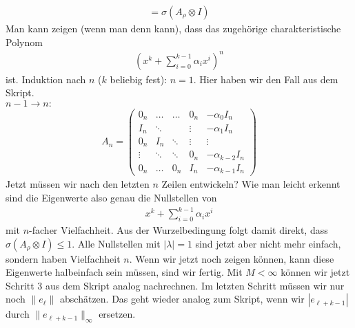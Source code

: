 \begin{solution}
\begin{align*}
  = \sigma(A_{\rho} \otimes I)
\end{align*}
Man kann zeigen (wenn man denn kann), dass das zugehörige charakteristische Polynom
\begin{align*}
  \left(x^k + \sum_{i = 0}^{k-1}\alpha_ix^i\right)^n
\end{align*}
ist. Induktion nach $n$ ($k$ beliebig fest): $n = 1$.
Hier haben wir den Fall aus dem Skript. \\
$n-1 \to n:$
\begin{align*}
  A_n = \begin{pmatrix}
    0_n & \hdots & \hdots & 0_n & -\alpha_0I_n \\
    I_n & \ddots & & \vdots & -\alpha_1I_n \\
    0_n & I_n & \ddots & \vdots & \vdots \\
    \vdots & \ddots & \ddots & 0_n & -\alpha_{k-2}I_n \\
    0_n & \hdots & 0_n & I_n & -\alpha_{k-1}I_n
  \end{pmatrix}
\end{align*}
Jetzt müssen wir nach den letzten $n$ Zeilen entwickeln?
Wie man leicht erkennt sind die Eigenwerte also genau die Nullstellen von
\begin{align*}
  x^k + \sum_{i = 0}^{k-1}\alpha_ix^i
\end{align*}
mit $n$-facher Vielfachheit. Aus der Wurzelbedingung folgt damit direkt, dass
$\sigma(A_{\rho} \otimes I) \leq 1$. Alle Nullstellen mit $|\lambda| = 1$
sind jetzt aber nicht mehr einfach, sondern haben Vielfachheit $n$.
Wenn wir jetzt noch zeigen können, kann diese Eigenwerte halbeinfach sein müssen,
sind wir fertig.
Mit $M < \infty$ können wir jetzt Schritt 3 aus dem Skript analog nachrechnen.
Im letzten Schritt müssen wir nur noch $\|e_{\ell}\|$ abschätzen.
Das geht wieder analog zum Skript, wenn wir $|e_{\ell + k  - 1}|$
durch $\|e_{\ell + k  - 1}\|_{\infty}$ ersetzen.
\end{solution}
